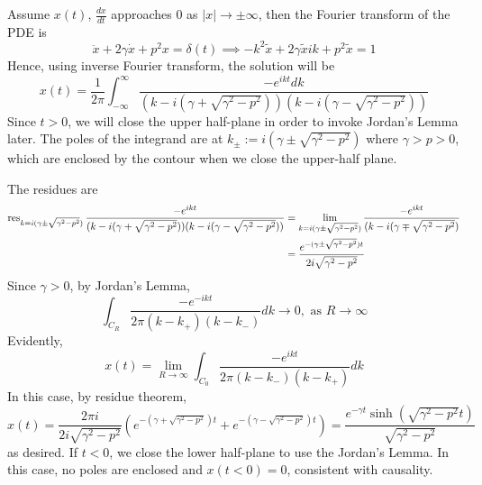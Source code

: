 \documentclass[a4paper]{article}
\begin{document}
\begin{ans}
Assume $x(t)$, $\frac{dx}{dt}$ approaches 0 as $|x|\rightarrow\pm\infty$, then the Fourier transform of the PDE is
$$\ddot{x}+2\gamma\dot{x}+p^2x=\delta(t)\implies -k^2\tilde{x}+2\gamma\tilde{x}ik+p^2\tilde{x}=1$$
Hence, using inverse Fourier transform, the solution will be
$$x(t)=\frac{1}{2\pi}\int_{-\infty}^\infty\frac{-e^{ikt}dk}{(k-i(\gamma+\sqrt{\gamma^2-p^2}))(k-i(\gamma-\sqrt{\gamma^2-p^2}))}$$
Since $t>0$, we will close the upper half-plane in order to invoke Jordan's Lemma later. The poles of the integrand are at $k_\pm:=i(\gamma\pm\sqrt{\gamma^2-p^2})$ where $\gamma>p>0$, which are enclosed by the contour when we close the upper-half plane. 
\begin{center}
  \end{center}
The residues are
\begin{align}
\operatorname{res}_{k=i(\gamma\pm\sqrt{\gamma^2-p^2})}\frac{-e^{ikt}}{(k-i(\gamma+\sqrt{\gamma^2-p^2}))(k-i(\gamma-\sqrt{\gamma^2-p^2}))}&=\lim_{k=i(\gamma\pm\sqrt{\gamma^2-p^2})}\frac{-e^{ikt}}{(k-i(\gamma\mp\sqrt{\gamma^2-p^2})}\nonumber\\&=\frac{e^{-(\gamma\pm\sqrt{\gamma^2-p^2})t}}{2i\sqrt{\gamma^2-p^2}}\nonumber
\end{align}
Since $\gamma>0$, by Jordan's Lemma,
$$\int_{C_R}\frac{-e^{-ikt}}{2\pi(k-k_+)(k-k_-)}dk\rightarrow 0,\text{ as }R\rightarrow\infty$$
Evidently,
$$x(t)=\lim_{R\rightarrow\infty}\int_{C_0}\frac{-e^{ikt}}{2\pi(k-k_-)(k-k_+)}dk$$
In this case, by residue theorem,
$$x(t)=\frac{2\pi i}{2i\sqrt{\gamma^2-p^2}}(e^{-(\gamma+\sqrt{\gamma^2-p^2})t}+e^{-(\gamma-\sqrt{\gamma^2-p^2})t})=\frac{e^{-\gamma t}\sinh(\sqrt{\gamma^2-p^2}t)}{\sqrt{\gamma^2-p^2}}$$
as desired. If $t<0$, we close the lower half-plane to use the Jordan's Lemma. In this case, no poles are enclosed and $x(t<0)=0$, consistent with causality.
\end{ans}
\end{document}

